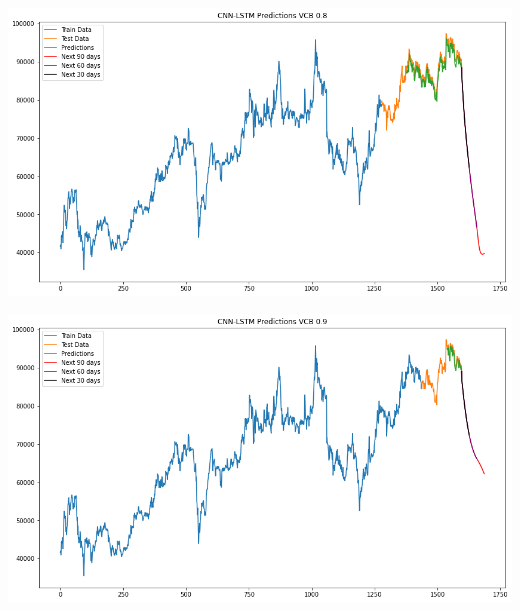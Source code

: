 \documentclass[conference]{IEEEtran}
\begin{document}
\begin{minipage}{0.21\textwidth}
    \centering
    \includegraphics[width=\linewidth]{images/CNN-LSTM/CNNLSTM_VCB_82.png}
    \label{fig:image1}
\end{minipage}
\hfill
\begin{minipage}{0.21\textwidth}
    \centering
    \includegraphics[width=\linewidth]{images/CNN-LSTM/CNNLSTM_VCB_91.png}
    \label{fig:image2}
\end{minipage}
\end{document}
